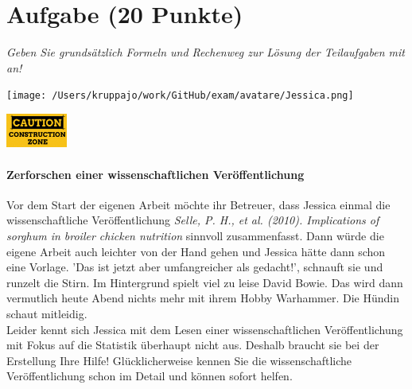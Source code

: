 \documentclass[a4paper, 9pt]{scrartcl}\usepackage[]{graphicx}\usepackage[]{xcolor}
\begin{document}
\section{Aufgabe \hfill (20 Punkte)}

\textit{Geben Sie grundsätzlich Formeln und Rechenweg zur Lösung der Teilaufgaben mit an!} \\[1Ex]
 

 
\begin{minipage}[t]{0.5\textwidth}
\texttt{[image: /Users/kruppajo/work/GitHub/exam/avatare/Jessica.png]}
\end{minipage}
\begin{minipage}[t]{0.5\textwidth}
\hfill
\href{https://youtu.be/C9skfFRTHhI}{\includegraphics[width = 2cm]{img/caution}}
\end{minipage}



\paragraph{Zerforschen einer wissenschaftlichen Veröffentlichung}

Vor dem Start der eigenen Arbeit möchte ihr Betreuer, dass Jessica einmal die wissenschaftliche Veröffentlichung \textit{Selle, P. H., et al. (2010). Implications of sorghum in broiler chicken nutrition} sinnvoll zusammenfasst. Dann würde die eigene Arbeit auch leichter von der Hand gehen und Jessica hätte dann schon eine Vorlage. 'Das ist jetzt aber umfangreicher als gedacht!', schnauft sie und runzelt die Stirn. Im Hintergrund spielt viel zu leise David Bowie. Das wird dann vermutlich heute Abend nichts mehr mit ihrem Hobby Warhammer. Die Hündin schaut mitleidig.\\

Leider kennt sich Jessica mit dem Lesen einer wissenschaftlichen Veröffentlichung mit Fokus auf die Statistik überhaupt nicht aus. Deshalb braucht sie bei der Erstellung Ihre Hilfe! Glücklicherweise kennen Sie die wissenschaftliche Veröffentlichung schon im Detail und können sofort helfen.
\end{document}
